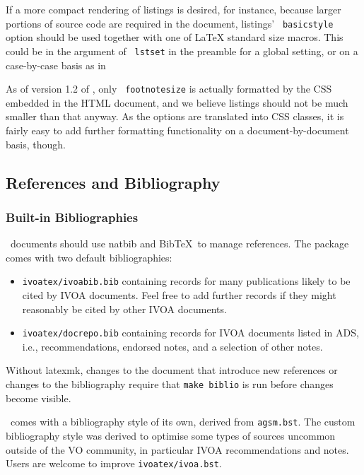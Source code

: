 \documentclass[11pt,a4paper]{ivoa}
\newcommand{\texword}[1]{\texttt{\color{texcolor} #1}}
\newcommand{\BibTeX}{Bib\TeX}
\begin{document}
If a more compact rendering of listings is desired, for instance,
because larger portions of source code are required in the document,
listings' \texword{basic\-style} option should be used together with one
of LaTeX standard size macros.  This could be in the argument of
\texword{lstset} in the preamble for a global setting, or on a
case-by-case basis as in



As of version 1.2 of \ivoatex, only \texword{footnotesize} is actually
formatted by the CSS embedded in the HTML document, and we believe
listings should not be much smaller than that anyway.  As the options
are translated into CSS classes, it is fairly easy to add further
formatting functionality on a document-by-document basis, though.

\subsection{References and Bibliography}

\subsubsection{Built-in Bibliographies}
\ivoatex\ documents should use natbib and \BibTeX\ to manage references.
The package comes with two default bibliographies:

\begin{itemize}
\item \texttt{ivoatex/ivoabib.bib} containing records for many publications
likely to be cited by IVOA documents.  Feel free to add further records
if they might reasonably be cited by other IVOA documents.
\item\texttt{ivoatex/docrepo.bib} containing records for IVOA documents
listed in ADS, i.e., recommendations, endorsed notes, and a selection of
other notes.
\end{itemize}

Without latexmk, changes to the document that
introduce new references or changes to the
bibliography require that \texttt{make biblio} is run before changes
become visible.

\ivoatex\ comes with a bibliography style of its own, derived from
\texttt{agsm.bst}.  The custom bibliography style was derived to
optimise some types of sources uncommon outside of the VO community, in
particular IVOA recommendations and notes.  Users are welcome to improve
\texttt{ivoatex/ivoa.bst}.
\end{document}
